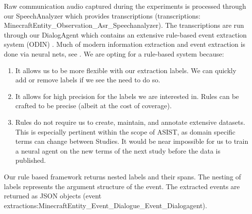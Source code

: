 Raw communication audio captured during the experiments is processed through our SpeechAnalyzer which provides transcriptions (transcriptions: MinecraftEntity_Observation_Asr_Speechanalyzer). The transcriptions are run through our DialogAgent which contains an extensive rule-based event extraction system (ODIN) \citep{valenzuela-escarcega-etal-2016-odins}. Much of modern information extraction and event extraction is done via neural nets, see \citet{Ahmad2021GATEGA,Du2020EventEB}. We are opting for a rule-based system because:
\begin{enumerate}
 \item It allows us to be more flexible with our extraction labels. We can quickly add or remove labels if we see the need to do so.
 \item It allows for high precision for the labels we are interested in. Rules can be crafted to be precise (albeit at the cost of coverage).
 \item Rules do not require us to create, maintain, and annotate extensive datasets. This is especially pertinent within the scope of ASIST, as domain specific terms can change between Studies. It would be near impossible for us to train a neural agent on the new terms of the next study before the data is published.
\end{enumerate}

Our rule based framework returns nested labels and their spans. The nesting of labels represents the argument structure of the event. The extracted events are returned as JSON objects (event extractions:MinecraftEntity_Event_Dialogue_Event_Dialogagent). 



